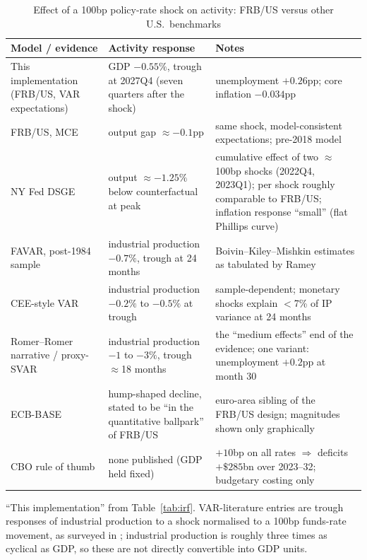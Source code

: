 \begin{table}[htbp]
\centering
\caption{Effect of a 100bp policy-rate shock on activity: FRB/US versus other U.S.\ benchmarks}
\label{tab:crossmodel}
\footnotesize
\begin{tabularx}{\textwidth}{>{\raggedright\arraybackslash}p{}>{\raggedright\arraybackslash}p{}>{\raggedright\arraybackslash}X}
\toprule
Model / evidence & Activity response & Notes \\
\midrule
This implementation (FRB/US, VAR expectations) & GDP $-0.55\%$, trough at 2027Q4 (seven quarters after the shock) & unemployment $+0.26$pp; core inflation $-0.034$pp \\
FRB/US, MCE \citep{brayton2014note} & output gap $\approx-0.1$pp & same shock, model-consistent expectations; pre-2018 model \\
NY Fed DSGE \citep{delnegro2023lagged} & output $\approx-1.25\%$ below counterfactual at peak & cumulative effect of two $\approx$100bp shocks (2022Q4, 2023Q1); per shock roughly comparable to FRB/US; inflation response ``small'' (flat Phillips curve) \\
FAVAR, post-1984 sample \citep{ramey2016shocks} & industrial production $-0.7\%$, trough at 24 months & Boivin--Kiley--Mishkin estimates as tabulated by Ramey \\
CEE-style VAR \citep{ramey2016shocks} & industrial production $-0.2\%$ to $-0.5\%$ at trough & sample-dependent; monetary shocks explain $<$7\% of IP variance at 24 months \\
Romer--Romer narrative / proxy-SVAR \citep{ramey2016shocks} & industrial production $-1$ to $-3\%$, trough $\approx$18 months & the ``medium effects'' end of the evidence; one variant: unemployment $+0.2$pp at month 30 \\
ECB-BASE \citep{angelini2019ecbbase} & hump-shaped decline, stated to be ``in the quantitative ballpark'' of FRB/US & euro-area sibling of the FRB/US design; magnitudes shown only graphically \\
CBO rule of thumb \citep{cbo2022rules} & none published (GDP held fixed) & $+10$bp on all rates $\Rightarrow$ deficits $+\$285$bn over 2023--32; budgetary costing only \\
\bottomrule
\end{tabularx}

\medskip
\parbox{0.97\textwidth}{\footnotesize ``This implementation'' from Table~\ref{tab:irf}. VAR-literature entries are trough responses of industrial production to a shock normalised to a 100bp funds-rate movement, as surveyed in \citet{ramey2016shocks}; industrial production is roughly three times as cyclical as GDP, so these are not directly convertible into GDP units.}
\end{table}

